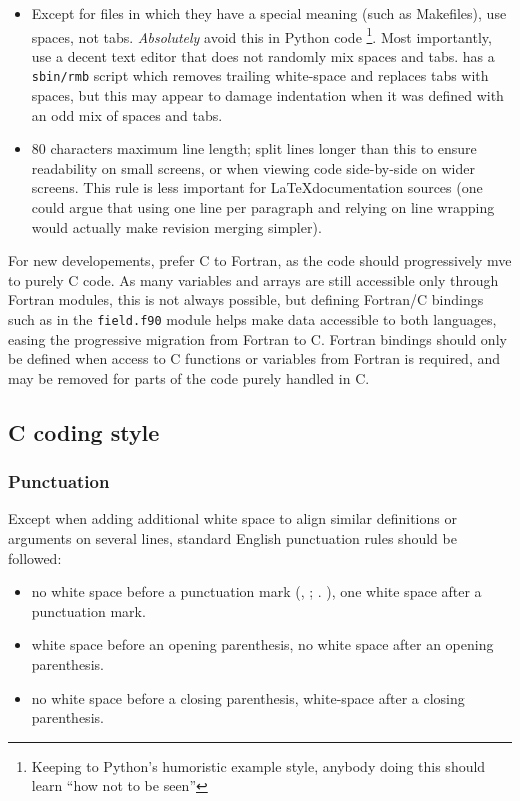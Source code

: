 \begin{itemize}
\item Except for files in which they have a special meaning (such as
      Makefiles), use spaces, not tabs. \emph{Absolutely} avoid this in
      Python code \footnote{Keeping to Python's humoristic example style,
      anybody doing this should learn ``how not to be seen''}. Most importantly,
      use a decent text editor that does not randomly mix spaces and tabs.
      \CS has a \texttt{sbin/rmb} script which removes trailing
      white-space and replaces tabs with spaces, but this may appear to damage
      indentation when it was defined with an odd mix of spaces and tabs.
\item 80 characters maximum line length; split lines longer than this
      to ensure readability on small screens, or when viewing code side-by-side
      on wider screens. This rule is less important for \LaTeX documentation
      sources (one could argue that using one line per paragraph and relying
      on line wrapping would actually make revision merging simpler).
\end{itemize}

For new developements, prefer C to Fortran, as the code should progressively
mve to purely C code. As many variables and arrays are still accessible
only through Fortran modules, this is not always possible, but defining
Fortran/C bindings such as in the \texttt{field.f90} module helps
make data accessible to both languages, easing the progressive migration
from Fortran to C. Fortran bindings should only be defined when access
to C functions or variables from Fortran is required, and may be removed
for parts of the code purely handled in C.

\subsection{C coding style}

\subsubsection{Punctuation}

Except when adding additional white space to align similar definitions
or arguments on several lines, standard English punctuation rules should be
followed:

\begin{itemize}
\item no white space before a punctuation mark (, ; . ), one white space
      after a punctuation mark.

\item white space before an opening parenthesis, no white space after an opening
      parenthesis.

\item no white space before a closing parenthesis, white-space after a closing
      parenthesis.
\end{itemize}

